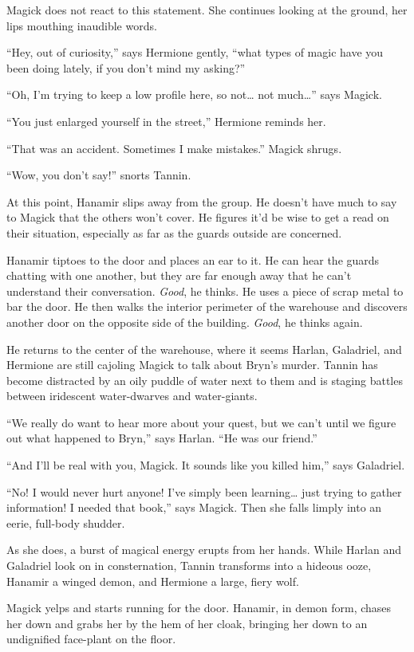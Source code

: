 \documentclass[smalldemyvopaper,11pt,twoside,onecolumn,openright,extrafontsizes]{memoir}
\begin{document}
Magick does not react to this statement. She continues looking at the
ground, her lips mouthing inaudible words.

``Hey, out of curiosity,'' says Hermione gently, ``what types of magic
have you been doing lately, if you don't mind my asking?''

``Oh, I'm trying to keep a low profile here, so not\ldots{} not
much\ldots{}'' says Magick.

``You just enlarged yourself in the street,'' Hermione reminds her.

``That was an accident. Sometimes I make mistakes.'' Magick shrugs.

``Wow, you don't say!'' snorts Tannin.

At this point, Hanamir slips away from the group. He doesn't have much
to say to Magick that the others won't cover. He figures it'd be wise to
get a read on their situation, especially as far as the guards outside
are concerned.

Hanamir tiptoes to the door and places an ear to it. He can hear the
guards chatting with one another, but they are far enough away that he
can't understand their conversation. \emph{Good}, he thinks. He uses a
piece of scrap metal to bar the door. He then walks the interior
perimeter of the warehouse and discovers another door on the opposite
side of the building. \emph{Good}, he thinks again.

He returns to the center of the warehouse, where it seems Harlan,
Galadriel, and Hermione are still cajoling Magick to talk about Bryn's
murder. Tannin has become distracted by an oily puddle of water next to
them and is staging battles between iridescent water-dwarves and
water-giants.

``We really do want to hear more about your quest, but we can't until we
figure out what happened to Bryn,'' says Harlan. ``He was our friend.''

``And I'll be real with you, Magick. It sounds like you killed him,''
says Galadriel.

``No! I would never hurt anyone! I've simply been learning\ldots{} just
trying to gather information! I needed that book,'' says Magick. Then
she falls limply into an eerie, full-body shudder.

As she does, a burst of magical energy erupts from her hands. While
Harlan and Galadriel look on in consternation, Tannin transforms into a
hideous ooze, Hanamir a winged demon, and Hermione a large, fiery wolf.

Magick yelps and starts running for the door. Hanamir, in demon form,
chases her down and grabs her by the hem of her cloak, bringing her down
to an undignified face-plant on the floor.
\end{document}

